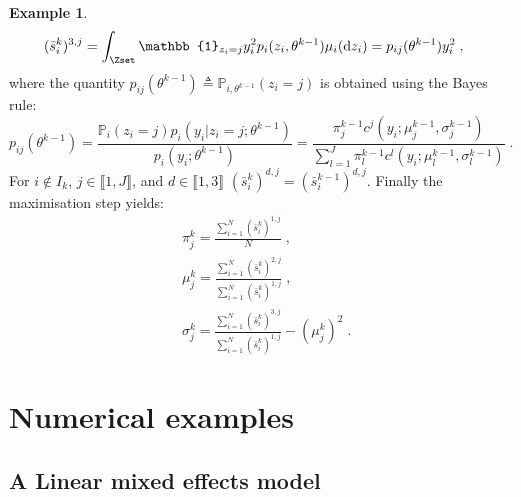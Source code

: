 \documentclass[11pt]{article}
\theoremstyle{plain}
\def\eqs{\;}
\newcommand{\indic}{\mathbb{1}}
\newcommand{\prob}{\mathbb{P}}
\theoremstyle{plain}
\theoremstyle{definition}
\newtheorem{exmp}{Example} %
\newcommand{\dz}{\mathrm{d}z}
\begin{document}
\begin{exmp}
\begin{align}
& (\bar{s}_i^k)^{3,j} = \int_{\Zset}{\indic_{z_i=j}y_i^2p_i(z_i,\theta^{k-1}) \mu_i(\dz_i)} = p_{ij}(\theta^{k-1})y_i^2\eqs,
\end{align}
where the quantity $p_{ij}(\theta^{k-1}) \triangleq \prob_{i,\theta^{k-1}}(z_i = j)$ is obtained using the Bayes rule:
\begin{equation}\label{gmm:condexpect}
p_{ij}(\theta^{k-1}) =\frac{\prob_i(z_i = j)p_i(y_i|z_i=j;\theta^{k-1})}{p_i(y_i; \theta^{k-1})}=\frac{\pi_j^{k-1} c^j(y_i;\mu^{k-1}_j,\sigma^{k-1}_j)}{\sum_{l=1}^{J}\pi_l^{k-1}c^l(y_i;\mu_l^{k-1}, \sigma_l^{k-1})}\eqs.
\end{equation}
For $i \notin I_k$, $j \in \llbracket 1, J \rrbracket$, and $d \in \llbracket 1,3 \rrbracket$ $(\bar{s}_i^k)^{d,j} = (\bar{s}_i^{k-1})^{d,j}$.
Finally the maximisation step yields:
\begin{align}
& \pi_j^k = \frac{\sum_{i=1}^{N}{(\bar{s}_i^k)^{1,j}}}{N}\eqs,\\
& \mu_j^k = \frac{\sum_{i=1}^{N}{(\bar{s}_i^k)^{2,j}}}{\sum_{i=1}^{N}{(\bar{s}_i^k)^{1,j}}} \eqs,\\
& \sigma_j^k = \frac{\sum_{i=1}^{N}{(\bar{s}_i^k)^{3,j}}}{\sum_{i=1}^{N}{(\bar{s}_i^k)^{1,j}}} - (\mu_j^k)^2\eqs.
\end{align}
\end{exmp}
\newpage


\section{Numerical examples}\label{sec:numerical}
\subsection{A Linear mixed effects model}
\end{document}
